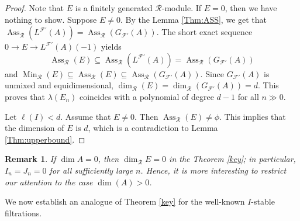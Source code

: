 \documentclass[11pt]{amsart}
\theoremstyle{plain}
\newtheorem{remark}[theorem]{Remark}
\newcommand{\R}{\mathcal{R}}
\newcommand{\F}{\mathcal{F}}
\theoremstyle{plain}
\begin{document}
\begin{proof}
     Note that $E$ is a finitely generated $\R$-module. If $E=0$, then we have nothing to show. Suppose $E\neq 0$. By the Lemma \ref{Thm:ASS}, we get that $\operatorname{Ass}_{\mathcal{R}}({L}^{\F'}(A))=\operatorname{Ass}_{\mathcal{R}}({G}_{\F'}(A)).$ The short exact sequence $0 \to E \to {L}^{\F'}(A)(-1)$ yields $$\operatorname{Ass}_{\mathcal{R}}(E)\subseteq \operatorname{Ass}_{\mathcal{R}}({L}^{\F'}(A))=\operatorname{Ass}_{\mathcal{R}}({G}_{\F'}(A))$$ and $\operatorname{Min}_{\mathcal{R}}(E) \subseteq \operatorname{Ass}_{\mathcal{R}}(E) \subseteq \operatorname{Ass}_{\mathcal{R}}({G}_{\F'}(A)).$
    Since ${G}_{\F'}(A)$ is unmixed and equidimensional,  $\operatorname{dim}_{\mathcal{R}}(E) = \operatorname{dim}_{\mathcal{R}}({G}_{\F'}({A}))=d.$ This proves that $\lambda(E_n)$ coincides with a polynomial of degree $d-1$ for all $n\gg0.$

    Let $\ell(I)<d$. Assume that $E\neq 0$. Then $\operatorname{Ass}_{\mathcal{R}}(E)\neq \phi.$ This implies that the dimension of $E$ is $d$, which is a contradiction to Lemma \ref{Thm:upperbound}.
\end{proof}

\begin{remark}
   If $\dim A = 0$, then $\dim_{\R} E = 0$ in the Theorem \ref{key}; in particular, $I_n = J_n = 0$ for all sufficiently large $n$. Hence, it is more interesting to restrict our attention to the case $\dim(A) > 0$.
\end{remark}

We now establish an analogue of Theorem \ref{key} for the well-known $I$-stable filtrations.
\end{document}
